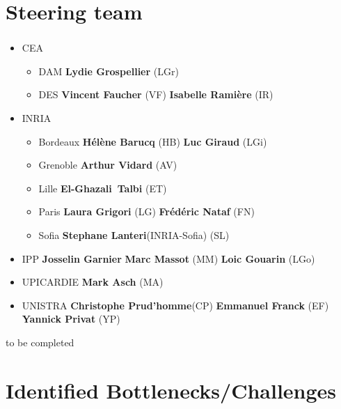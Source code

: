 \section{Steering team}
\begin{frame}
  \frametitle{\insertsectionhead}
  \framesubtitle{\insertsubsectionhead}
\scriptsize
  \begin{itemize}
    \item CEA 
    \begin{itemize}
      \item DAM \textbf{Lydie Grospellier} (LGr)
      \item DES \textbf{Vincent Faucher} (VF) \textbf{Isabelle Ramière} (IR)  
    \end{itemize}
    \item INRIA 
    \begin{itemize}
      \item Bordeaux \textbf{Hélène Barucq} (HB) \textbf{Luc Giraud} (LGi)
      \item  Grenoble \textbf{Arthur Vidard} (AV)
      \item Lille \textbf{El-Ghazali Talbi} (ET) 
      \item Paris \textbf{Laura Grigori} (LG) \textbf{Frédéric Nataf} (FN)
      \item Sofia \textbf{Stephane Lanteri}(INRIA-Sofia) (SL) 
    \end{itemize}
    \item IPP \textbf{Josselin Garnier} \textbf{Marc Massot} (MM) \textbf{Loic Gouarin} (LGo)
    \item UPICARDIE \textbf{Mark Asch} (MA)
    \item UNISTRA \textbf{Christophe Prud'homme}(CP) \textbf{Emmanuel Franck} (EF) \textbf{Yannick Privat} (YP)
  \end{itemize}
  \alert{to be completed}
\end{frame}

\section{Identified Bottlenecks/Challenges}

